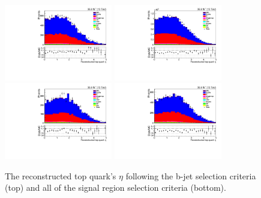 \begin{figure}[ht]
\centering
\includegraphics[width=0.42\textwidth]{figs/background-estimation/plots/unblinded/prompt_ee_ttbarInc/topEta_NPL_ee_bTag_ee.pdf}
\includegraphics[width=0.42\textwidth]{figs/background-estimation/plots/unblinded/prompt_mumu_ttbarInc/topEta_NPL_mumu_bTag_mumu.pdf}
\\
\includegraphics[width=0.42\textwidth]{figs/background-estimation/plots/unblinded/prompt_ee_ttbarInc/topEta_NPL_ee_wMass_ee.pdf}
\includegraphics[width=0.42\textwidth]{figs/background-estimation/plots/unblinded/prompt_mumu_ttbarInc/topEta_NPL_mumu_wMass_mumu.pdf}
\caption{
The reconstructed top quark's $\eta$ following the b-jet selection criteria (top) and all of the signal region selection criteria (bottom).
}
\label{fig:SR_topEta}
\end{figure}

\clearpage
\newpage	

